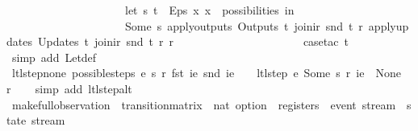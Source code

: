 \begin{isabellebody}
\ \ \ \ \ \ \ \ \ \ \ \ \ \ \ \ \ \ \ \ \ let\ {\isacharparenleft}s{\isacharprime}{\isacharcomma}\ t{\isacharprime}{\isacharparenright}\ {\isacharequal}\ Eps\ {\isacharparenleft}{\isasymlambda}x{\isachardot}\ x\ {\isacharbar}{\isasymin}{\isacharbar}\ possibilities{\isacharparenright}\ in\isanewline
\ \ \ \ \ \ \ \ \ \ \ \ \ \ \ \ \ \ \ \ \ {\isacharparenleft}Some\ s{\isacharprime}{\isacharcomma}\ {\isacharparenleft}apply{\isacharunderscore}outputs\ {\isacharparenleft}Outputs\ t{\isacharprime}{\isacharparenright}\ {\isacharparenleft}join{\isacharunderscore}ir\ {\isacharparenleft}snd\ t{\isacharparenright}\ r{\isacharparenright}{\isacharparenright}{\isacharcomma}\ {\isacharparenleft}apply{\isacharunderscore}updates\ {\isacharparenleft}Updates\ t{\isacharprime}{\isacharparenright}\ {\isacharparenleft}join{\isacharunderscore}ir\ {\isacharparenleft}snd\ t{\isacharparenright}\ r{\isacharparenright}\ r{\isacharparenright}{\isacharparenright}\isanewline
\ \ \ \ \ \ \ \ \ \ \ \ \ \ \ \ \ \ {\isacharparenright}{\isachardoublequoteclose}\isanewline
%
\isadelimproof
\ \ %
\endisadelimproof
%
\isatagproof
{}\isamarkupfalse%
\ {\isacharparenleft}case{\isacharunderscore}tac\ t{\isacharparenright}\isanewline
\ \ \isamarkupfalse%
\ {\isacharparenleft}simp\ add{\isacharcolon}\ Let{\isacharunderscore}def{\isacharparenright}%
\endisatagproof
{\isafoldproof}%
%
\isadelimproof
\isanewline
%
\endisadelimproof
\isanewline
{}\isamarkupfalse%
\ ltl{\isacharunderscore}step{\isacharunderscore}none{\isacharcolon}\ {\isachardoublequoteopen}possible{\isacharunderscore}steps\ e\ s\ r\ {\isacharparenleft}fst\ ie{\isacharparenright}\ {\isacharparenleft}snd\ ie{\isacharparenright}\ {\isacharequal}\ {\isacharbraceleft}{\isacharbar}{\isacharbar}{\isacharbraceright}\ {\isasymLongrightarrow}\ ltl{\isacharunderscore}step\ e\ {\isacharparenleft}Some\ s{\isacharparenright}\ r\ ie\ {\isacharequal}\ {\isacharparenleft}None{\isacharcomma}\ {\isacharbrackleft}{\isacharbrackright}{\isacharcomma}\ r{\isacharparenright}{\isachardoublequoteclose}\isanewline
%
\isadelimproof
\ \ %
\endisadelimproof
%
\isatagproof
{}\isamarkupfalse%
\ {\isacharparenleft}simp\ add{\isacharcolon}\ ltl{\isacharunderscore}step{\isacharunderscore}alt{\isacharparenright}%
\endisatagproof
{\isafoldproof}%
%
\isadelimproof
\isanewline
%
\endisadelimproof
\isanewline
{}\isamarkupfalse%
\ make{\isacharunderscore}full{\isacharunderscore}observation\ {\isacharcolon}{\isacharcolon}\ {\isachardoublequoteopen}transition{\isacharunderscore}matrix\ {\isasymRightarrow}\ nat\ option\ {\isasymRightarrow}\ registers\ {\isasymRightarrow}\ event\ stream\ {\isasymRightarrow}\ state\ stream{\isachardoublequoteclose}\ \isanewline

\end{isabellebody}
